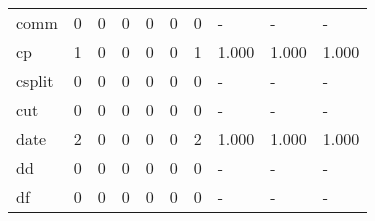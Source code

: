 \begin{longtable}{lp{1.3cm}p{1.3cm}p{1.3cm}p{1.3cm}p{1.3cm}p{1.3cm}p{1.3cm}p{1.3cm}p{1.3cm}}
comm      &                      0 &                                             0 &                                            0 &                                           0 &                                            0 &                                          0 &                                    - &                                      - &                                    - \\
cp        &                      1 &                                             0 &                                            0 &                                           0 &                                            0 &                                          1 &                                1.000 &                                  1.000 &                                1.000 \\
csplit    &                      0 &                                             0 &                                            0 &                                           0 &                                            0 &                                          0 &                                    - &                                      - &                                    - \\
cut       &                      0 &                                             0 &                                            0 &                                           0 &                                            0 &                                          0 &                                    - &                                      - &                                    - \\
date      &                      2 &                                             0 &                                            0 &                                           0 &                                            0 &                                          2 &                                1.000 &                                  1.000 &                                1.000 \\
dd        &                      0 &                                             0 &                                            0 &                                           0 &                                            0 &                                          0 &                                    - &                                      - &                                    - \\
df        &                      0 &                                             0 &                                            0 &                                           0 &                                            0 &                                          0 &                                    - &                                      - &                                    - \\

\end{longtable}
